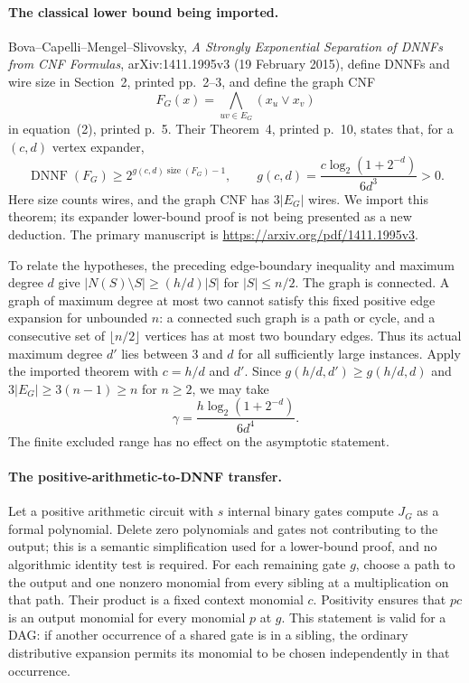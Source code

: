 \paragraph{The classical lower bound being imported.}
Bova--Capelli--Mengel--Slivovsky, \emph{A Strongly Exponential
Separation of DNNFs from CNF Formulas}, arXiv:1411.1995v3
(19 February 2015), define DNNFs and wire size in Section~2,
printed pp.~2--3, and define the graph CNF
\[
                  F_G(x)=\bigwedge_{uv\in E_G}(x_u\vee x_v)
\]
in equation~(2), printed p.~5.  Their Theorem~4, printed p.~10,
states that, for a $(c,d)$ vertex expander,
\[
 \operatorname{DNNF}(F_G)\ge
      2^{g(c,d)\operatorname{size}(F_G)-1},
 \qquad
 g(c,d)=\frac{c\log_2(1+2^{-d})}{6d^3}>0.
\]
Here size counts wires, and the graph CNF has $3|E_G|$ wires.
We import this theorem; its expander lower-bound proof is not
being presented as a new deduction.  The primary manuscript is
\url{https://arxiv.org/pdf/1411.1995v3}.

To relate the hypotheses, the preceding edge-boundary inequality
and maximum degree $d$ give
$|N(S)\setminus S|\ge(h/d)|S|$ for $|S|\le n/2$.
The graph is connected.  A graph of maximum degree at most two
cannot satisfy this fixed positive edge expansion for unbounded
$n$: a connected such graph is a path or cycle, and a consecutive
set of $\lfloor n/2\rfloor$ vertices has at most two boundary edges.
Thus its actual maximum degree $d'$ lies between $3$ and $d$ for
all sufficiently large instances.  Apply the imported theorem
with $c=h/d$ and $d'$.  Since
$g(h/d,d')\ge g(h/d,d)$ and
$3|E_G|\ge3(n-1)\ge n$ for $n\ge2$, we may take
\[
                 \gamma=\frac{h\log_2(1+2^{-d})}{6d^4}.
\]
The finite excluded range has no effect on the asymptotic statement.

\paragraph{The positive-arithmetic-to-DNNF transfer.}
Let a positive arithmetic circuit with $s$ internal binary gates
compute $J_G$ as a formal polynomial.  Delete zero polynomials
and gates not contributing to the output; this is a semantic
simplification used for a lower-bound proof, and no algorithmic
identity test is required.  For each remaining gate $g$, choose
a path to the output and one nonzero monomial from every sibling
at a multiplication on that path.  Their product is a fixed
context monomial $c$.  Positivity ensures that $pc$ is an output
monomial for every monomial $p$ at $g$.  This statement is valid
for a DAG: if another occurrence of a shared gate is in a sibling,
the ordinary distributive expansion permits its monomial to be
chosen independently in that occurrence.

